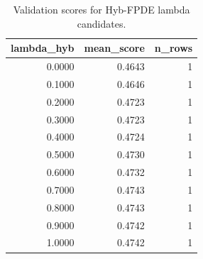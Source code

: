 \begin{table}[t]
\caption{Validation scores for Hyb-FPDE lambda candidates.}
\label{tab:lambda_distribution_computed}
\centering
\begin{tabular}{rrr}
\toprule
lambda\_hyb & mean\_score & n\_rows \\
\midrule
0.0000 & 0.4643 & 1 \\
0.1000 & 0.4646 & 1 \\
0.2000 & 0.4723 & 1 \\
0.3000 & 0.4723 & 1 \\
0.4000 & 0.4724 & 1 \\
0.5000 & 0.4730 & 1 \\
0.6000 & 0.4732 & 1 \\
0.7000 & 0.4743 & 1 \\
0.8000 & 0.4743 & 1 \\
0.9000 & 0.4742 & 1 \\
1.0000 & 0.4742 & 1 \\
\bottomrule
\end{tabular}

\end{table}

